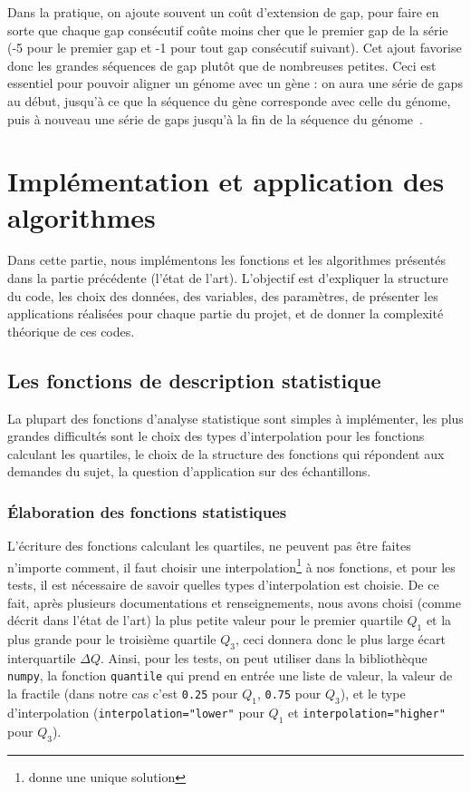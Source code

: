 \documentclass[12pt]{article}
\begin{document}
Dans la pratique, on ajoute souvent un coût d'extension de gap, pour faire en sorte que chaque gap consécutif coûte moins cher que le premier gap de la série (-5 pour le premier gap et -1 pour tout gap consécutif suivant). Cet ajout favorise donc les grandes séquences de gap plutôt que de nombreuses petites. Ceci est essentiel pour pouvoir aligner un génome avec un gène : on aura une série de gaps au début, jusqu'à ce que la séquence du gène corresponde avec celle du génome, puis à nouveau une série de gaps jusqu'à la fin de la séquence du génome~\cite{alignmit}.\\

\newpage

\section{Implémentation et application des algorithmes} 
Dans cette partie, nous implémentons les fonctions et les algorithmes présentés dans la partie précédente (l'état de l'art). L'objectif est d'expliquer la structure du code, les choix des données, des variables, des paramètres, de présenter les applications réalisées pour chaque partie du projet, et de donner la complexité théorique de ces codes.



\subsection{Les fonctions de description statistique}
La plupart des fonctions d'analyse statistique sont simples à implémenter, les plus grandes difficultés sont le choix des types d'interpolation pour les fonctions calculant les quartiles, le choix de la structure des fonctions qui répondent aux demandes du sujet, la question d'application sur des échantillons.




\subsubsection{Élaboration des fonctions statistiques}
L'écriture des fonctions calculant les quartiles, ne peuvent pas être faites n'importe comment, il faut choisir une interpolation\footnote{donne une unique solution} à nos fonctions, et pour les tests, il est nécessaire de savoir quelles types d'interpolation est choisie. De ce fait, après plusieurs documentations et renseignements, nous avons choisi (comme décrit dans l'état de l'art) la plus petite valeur pour le premier quartile $Q_1$ et la plus grande pour le troisième quartile $Q_3$, ceci donnera donc le plus large écart interquartile $\Delta Q$. Ainsi, pour les tests, on peut utiliser dans la bibliothèque \texttt{numpy}, la fonction \texttt{quantile} qui prend en entrée une liste de valeur, la valeur de la fractile (dans notre cas c'est \texttt{0.25} pour $Q_1$, \texttt{0.75} pour $Q_3$), et le type d'interpolation (\texttt{interpolation="lower"} pour $Q_1$ et \texttt{interpolation="higher"} pour $Q_3$).\\
\end{document}
